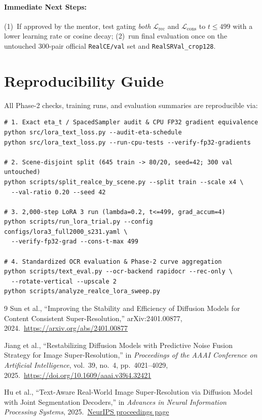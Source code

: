 \documentclass[11pt]{article}
\begin{document}
\paragraph{Immediate Next Steps:} (1)~If approved by the mentor, test gating \emph{both} $\mathcal{L}_{\text{rec}}$ and $\mathcal{L}_{\text{cons}}$ to $t \le 499$ with a lower learning rate or cosine decay; (2)~run final evaluation once on the untouched $300$-pair official \texttt{RealCE/val} set and \texttt{RealSRVal\_crop128}.

\section{Reproducibility Guide}
All Phase-2 checks, training runs, and evaluation summaries are reproducible via:
\begin{verbatim}
# 1. Exact eta_t / SpacedSampler audit & CPU FP32 gradient equivalence
python src/lora_text_loss.py --audit-eta-schedule
python src/lora_text_loss.py --run-cpu-tests --verify-fp32-gradients

# 2. Scene-disjoint split (645 train -> 80/20, seed=42; 300 val untouched)
python scripts/split_realce_by_scene.py --split train --scale x4 \
  --val-ratio 0.20 --seed 42

# 3. 2,000-step LoRA 3 run (lambda=0.2, t<=499, grad_accum=4)
python scripts/run_lora_trial.py --config configs/lora3_full2000_s231.yaml \
  --verify-fp32-grad --cons-t-max 499

# 4. Standardized OCR evaluation & Phase-2 curve aggregation
python scripts/text_eval.py --ocr-backend rapidocr --rec-only \
  --rotate-vertical --upscale 2
python scripts/analyze_realce_lora_sweep.py
\end{verbatim}

\enlargethispage{2\baselineskip}
\begingroup
\footnotesize
\setlength{\itemsep}{0pt}
\begin{thebibliography}{9}
Sun et al., ``Improving the Stability and Efficiency of Diffusion Models for Content Consistent Super-Resolution,'' arXiv:2401.00877, 2024.\
\url{https://arxiv.org/abs/2401.00877}

Jiang et al., ``Restabilizing Diffusion Models with Predictive Noise Fusion Strategy for Image Super-Resolution,'' in \emph{Proceedings of the AAAI Conference on Artificial Intelligence}, vol.~39, no.~4, pp.~4021--4029, 2025.\
\url{https://doi.org/10.1609/aaai.v39i4.32421}

Hu et al., ``Text-Aware Real-World Image Super-Resolution via Diffusion Model with Joint Segmentation Decoders,'' in \emph{Advances in Neural Information Processing Systems}, 2025.\
\href{https://proceedings.neurips.cc/paper_files/paper/2025/hash/58ce6a4b9c16d11975f11e4a23871041-Abstract-Conference.html}{NeurIPS proceedings page}
\end{thebibliography}
\endgroup
\end{document}
